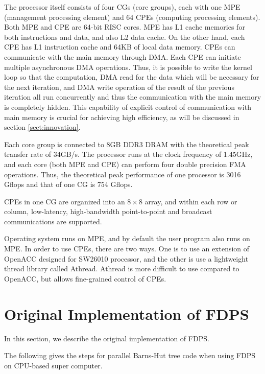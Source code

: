 \documentclass[oribibl]{llncs}
\begin{document}
The processor itself consists of four CGs (core groups), each with one
MPE (management processing element) and 64 CPEs (computing processing
elements). Both MPE and CPE are 64-bit RISC cores. MPE has L1 cache
memories for both instructions and data, and also L2 data cache. On
the other hand, each CPE has L1 instruction cache and 64KB of local
data memory. CPEs can communicate with the main memory through DMA.
Each CPE can initiate multiple asynchronous DMA operations. Thus, it
is possible to write the kernel loop so that the computation, DMA read
for the data which will be necessary for the next iteration, and DMA
write operation of the result of the previous iteration all run
concurrently and thus the communication with the main memory is
completely hidden. This capability of explicit control of
communication with main memory is crucial for achieving high
efficiency, as will be discussed in section \ref{sect:innovation}.

Each core group is connected to 8GB DDR3 DRAM with the theoretical
peak transfer rate of 34GB/s. The processor runs at the clock
frequency of 1.45GHz, and each core (both MPE and CPE) can perform
four double precision FMA operations. Thus, the theoretical peak
performance of one processor is 3016 Gflops and that of one CG is 754
Gflops.

CPEs in one CG are organized into an $8\times 8$ array, and within
each row or column, low-latency, high-bandwidth point-to-point and
broadcast communications are supported.

Operating system runs on MPE, and by default the user program also
runs on MPE. In order to use CPEs, there are two ways. One is to use
an extension of OpenACC designed for SW26010 processor, and the other
is use a lightweight thread library called Athread. Athread is more
difficult to use compared to OpenACC, but allows fine-grained control
of CPEs.

\section{Original Implementation of FDPS}
\label{sec:impl0}

In this section, we describe the original implementation of FDPS.

The following gives the steps for parallel Barns-Hut tree code when
using FDPS on CPU-based super computer.
\end{document}
